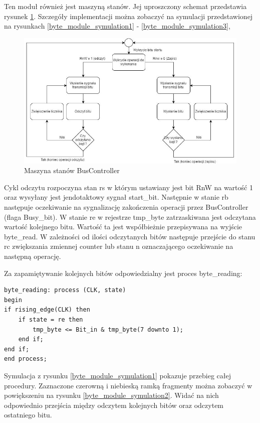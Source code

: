 \documentclass[a4paper]{article}
\begin{document}
Ten moduł również jest maszyną stanów. Jej uproszczony schemat przedstawia rysunek \ref{byte_module_fsm}. Szczegóły implementacji można zobaczyć na symulacji przedstawionej na rysunkach \ref{byte_module_symulation1} - \ref{byte_module_symulation3}, 

\begin{figure}[H]
\begin{center}
\includegraphics[width=15cm]{graphics/byte_module_fsm.png}
\end{center}
\caption{Maszyna stanów BusController}
\label{byte_module_fsm}
\end{figure}

Cykl odczytu rozpoczyna stan rs w którym ustawiany jest bit RnW na wartość 1 oraz wysyłany jest jendotaktowy sygnał start\_bit. Następnie w stanie rb następuje oczekiwanie na sygnalizację zakończenia operacji przez BusController (flaga Busy\_bit). W stanie re w rejestrze tmp\_byte zatrzaskiwana jest odczytana wartość kolejnego bitu. Wartość ta jest współbieżnie przepisywana na wyjście byte\_read. W zależności od ilości odczytanych bitów następuje przejście do stanu rc zwiększania zmiennej counter lub stanu n oznaczającego oczekiwanie na następną operację. 

Za zapamiętywanie kolejnych bitów odpowiedzialny jest proces byte\_reading:

\lstset{language=VHDL}
\begin{lstlisting}[frame=single]
byte_reading: process (CLK, state)
begin
if rising_edge(CLK) then
	if state = re then
		tmp_byte <= Bit_in & tmp_byte(7 downto 1);
	end if;
end if;
end process;
\end{lstlisting}

Symulacja z rysunku \ref{byte_module_symulation1} pokazuje przebieg całej procedury. Zaznaczone czerowną i niebieską ramką fragmenty można zobaczyć w powiększeniu na rysunku \ref{byte_module_symulation2}. Widać na nich odpowiednio przejścia między odczytem kolejnych bitów oraz odczytem ostatniego bitu.
\end{document}
